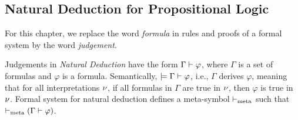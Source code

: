 



\subsection{Natural Deduction for Propositional Logic}

\begin{remark}
For this chapter, we replace the word \emph{formula} in rules and 
proofs of a formal system by the word \emph{judgement}.
\end{remark}

\begin{remark}
Judgements in \emph{Natural Deduction} have the form $\Gamma \vdash \varphi$, 
where $\Gamma$ is a set of formulas and $\varphi$ is a formula.
Semantically, $\models \Gamma \vdash \varphi$, i.e., $\Gamma$ derives $\varphi$, meaning that for all interpretations $\nu$, if all formulas in $\Gamma$ are true in $\nu$, then $\varphi$ is true in $\nu$.
Formal system for natural deduction defines a meta-symbol 
$\vdash_\text{meta}$ such that  $\vdash_\text{meta} (\Gamma \vdash 
\varphi)$. 
\end{remark}


